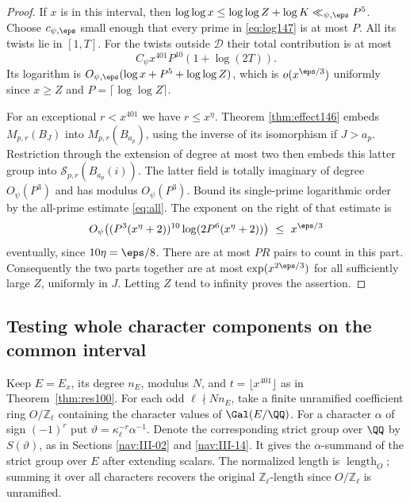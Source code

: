 \documentclass[a4paper,11pt]{article}
\theoremstyle{definition}
\theoremstyle{remark}
\newcommand{\ZZ}{\mathbb Z}\newcommand{\ord}{\operatorname{ord}}
\numberwithin{equation}{section}
\newcommand{\Sel}{\mathcal S}
\begin{document}
\begin{proof}
If \(x\) is in this interval, then
\(\log\log x\le\log\log Z+\log K\ll_{\psi,\eps}P^5\).
Choose \(c_{\psi,\eps}\) small enough that every prime in
\eqref{eq:log147} is at most \(P\). All its twists lie in
\([1,T]\). For the twists outside \(\mathcal D\) their total
contribution is at most
\[
         C_\psi x^{401}P^{10}(1+\log(2T)).
\]
Its logarithm is
\(O_{\psi,\eps}(\log x+P^5+\log\log Z)\), which is
\(o(x^{\eps/3})\) uniformly since \(x\ge Z\) and
\(P=\lceil\log\log Z\rceil\).

For an exceptional \(r<x^{401}\) we have \(r\le x^\eta\).
Theorem \ref{thm:effect146} embeds \(M_{p,r}(B_J)\) into
\(M_{p,r}(B_{a_p})\), using the inverse of its isomorphism if
\(J>a_p\). Restriction through the extension of degree at most
two then embeds this latter group into \(\Sel_{p,r}(B_{a_p}(i))\).
The latter field is totally imaginary of degree \(O_\psi(P^3)\)
and has modulus \(O_\psi(P^3)\). Bound its single-prime
logarithmic order by the all-prime estimate \eqref{eq:all}.
The exponent on the right of that estimate is
\[
     O_\psi\bigl((P^3(x^\eta+2))^{10}
                         \log(2P^6(x^\eta+2))\bigr)
                  \ \le\ x^{\eps/3}
\]
eventually, since \(10\eta=\eps/8\). There are at most
\(PR\) pairs to count in this part. Consequently the two
parts together are at most \(\exp(x^{2\eps/3})\) for all
sufficiently large \(Z\), uniformly in \(J\). Letting \(Z\)
tend to infinity proves the assertion.
\end{proof}

\subsection{Testing whole character components on the common interval}\label{nav:II-28}
Keep \(E=E_x\), its degree \(n_E\), modulus \(N\), and
\(t=\lfloor x^{401}\rfloor\) as in Theorem~\ref{thm:res100}.
For each odd \(\ell\nmid Nn_E\), take a finite unramified
coefficient ring \(O/\ZZ_\ell\) containing the character values
of \(\Gal(E/\QQ)\). For a character \(\alpha\) of sign \((-1)^r\)
put \(\vartheta=\kappa_\ell^{-r}\alpha^{-1}\). Denote the
corresponding strict group over \(\QQ\) by \(S(\vartheta)\),
as in Sections \ref{nav:III-02} and \ref{nav:III-14}. It gives the \(\alpha\)-summand of the strict group
over \(E\) after extending scalars. The normalized length is
\(\operatorname{length}_O\); summing it over all characters recovers
the original \(\ZZ_\ell\)-length since \(O/\ZZ_\ell\) is unramified.
\end{document}
